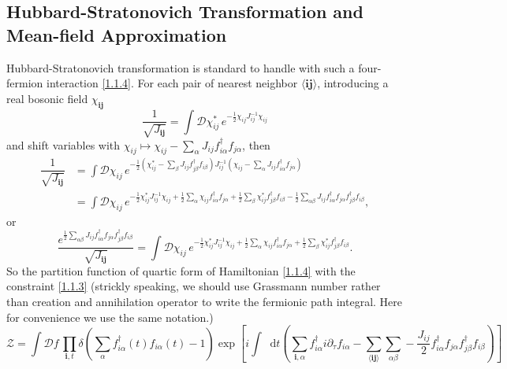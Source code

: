 \documentclass[10pt,nofootinbib]{revtex4}
\newcommand*\dd{\mathop{}\!\mathrm{d}}
\begin{document}
	\subsection{Hubbard-Stratonovich Transformation and Mean-field Approximation}
	Hubbard-Stratonovich transformation is standard to handle with such a four-fermion interaction \eqref{1.1.4}. For each pair of nearest neighbor $\langle\bm{ij}\rangle$, introducing a real bosonic field $\chi_{\bm{ij}}$
	\begin{equation*}
		\dfrac{1}{\sqrt{J_{\bm{ij}}}}=\int\mathcal{D}\chi_{ij}^*\,e^{-\frac12\chi_{ij}J_{ij}^{-1}\chi_{ij}}
	\end{equation*}
	and shift variables with $\chi_{ij}\mapsto\chi_{ij}-\sum_{\alpha} J_{ij}f_{i \alpha}^\dagger f_{j \alpha}$, then
	\begin{align*}
		\dfrac{1}{\sqrt{J_{\bm{ij}}}}&=\int\mathcal{D}\chi_{ij}\,e^{-\frac12(\chi^*_{ij}-\sum_\beta J_{ij}f_{j \beta}^\dagger f_{i \beta})J^{-1}_{ij}(\chi_{ij}-\sum_\alpha J_{ij}f_{i \alpha}^\dagger f_{j \alpha})}\\
		&=\int\mathcal{D}\chi_{ij}\,e^{-\frac12\chi_{ij}^*J_{ij}^{-1}\chi_{ij}+\frac12\sum_\alpha\chi_{ij}f_{i \alpha}^\dagger f_{j \alpha}+\frac12\sum_\beta\chi_{ij}^*f_{j \beta}^\dagger f_{i \beta}-\frac12\sum_{\alpha\beta} J_{ij}f_{i \alpha}^\dagger f_{j \alpha}f_{j \beta}^\dagger f_{i \beta}},
	\end{align*}
	or
	\begin{equation}\label{1.2.1}
		\dfrac{e^{\frac12\sum_{\alpha\beta} J_{ij}f_{i \alpha}^\dagger f_{j \alpha}f_{j \beta}^\dagger f_{i \beta}}}{\sqrt{J_{\bm{ij}}}}=\int\mathcal{D}\chi_{ij}\,e^{-\frac12\chi_{ij}^*J_{ij}^{-1}\chi_{ij}+\frac12\sum_\alpha\chi_{ij}f_{i \alpha}^\dagger f_{j \alpha}+\frac12\sum_\beta\chi_{ij}^*f_{j \beta}^\dagger f_{i \beta}}.
	\end{equation}
	So the partition function of quartic form of Hamiltonian \eqref{1.1.4} {\color{red}with the constraint} \eqref{1.1.3} (strickly speaking, we should use Grassmann number rather than creation and annihilation operator to write the fermionic path integral. Here for convenience we use the same notation.)
	\begin{equation*}
		\mathcal{Z}=\int\mathcal{D}f\,\prod_{\bm{i},t}\delta \left(\sum_\alpha f_{i \alpha}^\dagger(t)f_{i \alpha}(t)-1\right) \exp \left[i\int\dd t \left(\sum_{\bm{i},\alpha}f_{i \alpha}^\dagger i\partial_\tau f_{i \alpha}-\sum_{\langle\bm{ij}\rangle}\sum_{\alpha \beta}-\dfrac{J_{ij}}{2}f_{i \alpha}^\dagger f_{j \alpha}f_{j \beta}^\dagger f_{i \beta}\right)\right]
	\end{equation*}
\end{document}
